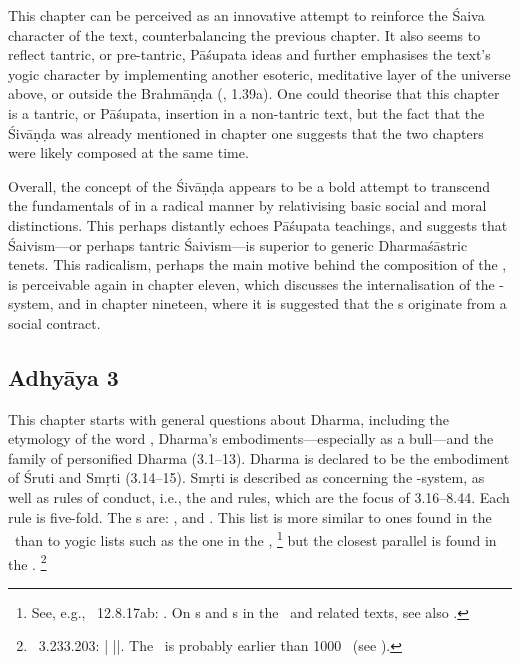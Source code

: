 This chapter can be perceived as an innovative attempt to reinforce the
Śaiva character of the text, counterbalancing the previous chapter.
It also seems to reflect tantric, or pre-tantric, Pāśupata ideas and 
further emphasises the text's yogic character by implementing 
another esoteric, meditative layer of the universe above, or outside
the Brahmāṇḍa (, 1.39a). One could theorise that
this chapter is a tantric, or Pāśupata, insertion in a non-tantric text, 
but the fact that the Śivāṇḍa was already mentioned in chapter 
one suggests that the two chapters were likely composed at the same time.
 
Overall, the concept of the Śivāṇḍa appears to be
a bold attempt to transcend the fundamentals of 
in a radical manner by relativising basic social and moral distinctions.
This perhaps distantly echoes Pāśupata teachings, and suggests that Śaivism---or
perhaps tantric Śaivism---is superior to generic Dharmaśāstric tenets. This radicalism,
perhaps the main motive behind the composition of the \VSS, is perceivable
again in chapter eleven, which discusses the internalisation of the -system, and 
in chapter nineteen, where it is suggested that the s originate from a social contract.
 



\subsection*{Adhyāya 3}\label{contents_of_ch03}

This chapter starts with general questions about Dharma,
including the etymology of the word , 
Dharma's embodiments---especially as a bull---and 
the family of personified Dharma (3.1--13).
Dharma is declared to be the embodiment of Śruti and Smṛti (3.14--15).
Smṛti is described as concerning the -system, as well as 
rules of conduct, i.e., the  and  rules, which are the
focus of 3.16--8.44. Each rule is five-fold.
The s are: , and . This list is more similar to
ones found in the \MBh\ than to yogic lists such as the one in the
\YogaS,%
		\footnote{See, e.g., \MBh\ 12.8.17ab: 
						.
						On s and s in the \SDHS\ and related
					   texts, see also .}
but the closest parallel is found in the \VDhU.%
		\footnote{\VDHU\ 3.233.203:
				 |
				 ||.
						The \VDhU\ is probably earlier than 1000 \CE\ (see 
						).}

